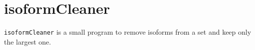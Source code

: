 \chapter{isoformCleaner}

\texttt{isoformCleaner} is a small program to remove isoforms from a set and keep only the largest one. 

